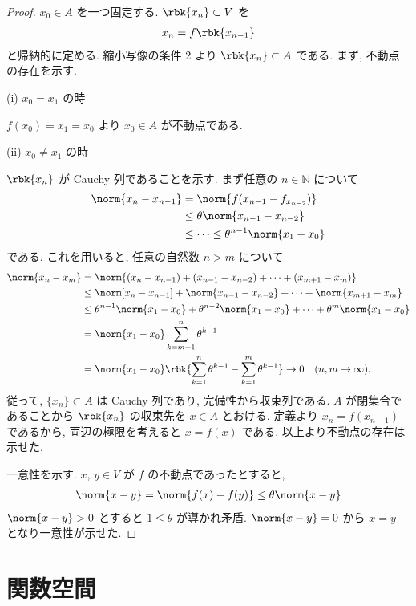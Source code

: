 \documentclass[openany, a4paper, oneside]{jsbook}
\begin{document}
\begin{proof}
$x_0 \in A$ を一つ固定する.
$\rbk{x_n} \subset V$ を
\begin{align*}
 x_n
 =
 f \rbk{x_{n - 1}}
\end{align*}
と帰納的に定める.
縮小写像の条件 2 より $\rbk{x_n} \subset A$ である.
まず, 不動点の存在を示す.

(i) $x_0=x_1$ の時

$f(x_0)=x_1=x_0$ より $x_0\in A$ が不動点である.

(ii) $x_0\not=x_1$ の時

$\rbk{x_n}$ が Cauchy 列であることを示す.
まず任意の $n\in\mathbb{N}$ について
\begin{align*}
 \norm{x_n - x_{n - 1}}
 &=
 \norm{f(x_{n-1} - f_{x_{n-2}})} \\
 &\leq
 \theta \norm{x_{n-1} - x_{n-2}} \\
 &\leq
 \cdots
 \leq \theta^{n-1} \norm{x_1 - x_0}
\end{align*}
である.
これを用いると, 任意の自然数 $n>m$ について
\begin{align*}
 \norm{x_n - x_m}
 &=
 \norm{(x_n - x_{n-1}) + (x_{n-1} - x_{n-2}) + \cdots + (x_{m+1} - x_{m})} \\
 &\leq
 \norm[x_n - x_{n-1}] + \norm{x_{n-1} - x_{n-2}} + \cdots + \norm{x_{m+1} - x_{m}} \\
 &\leq
 \theta^{n-1} \norm{x_1 - x_0} + \theta^{n-2} \norm{x_1 - x_0} + \cdots + \theta^m \norm{x_1 - x_0} \\
 &=
 \norm{x_1 - x_0} \sum_{k = m + 1}^{n} \theta^{k-1} \\
 &=
 \norm{x_1 - x_0} \rbk{\sum_{k=1}^{n} \theta^{k-1} - \sum_{k=1}^{m} \theta^{k-1}} \to 0 \quad (n, m \to \infty).
\end{align*}
従って, $\{x_n\}\subset A$ は Cauchy 列であり, 完備性から収束列である.
$A$ が閉集合であることから $\rbk{x_n}$ の収束先を $x \in A$ とおける.
定義より $x_n = f(x_{n-1})$ であるから, 両辺の極限を考えると $x = f(x)$ である.
以上より不動点の存在は示せた.

一意性を示す.
$x$, $y \in V$ が $f$ の不動点であったとすると,
\begin{align*}
 \norm{x - y}
 =
 \norm{f(x) - f(y)}
 \leq
 \theta \norm{x - y}
\end{align*}
$\norm{x - y} > 0$ とすると $1 \leq \theta$ が導かれ矛盾.
$\norm{x - y} = 0$ から $x = y$ となり一意性が示せた.
\end{proof}
\section{関数空間}
\end{document}
